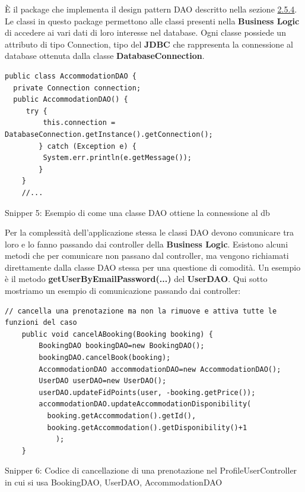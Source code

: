 \documentclass[10pt]{article}
\begin{document}
\`E il package che implementa il design pattern DAO descritto nella sezione \hyperref[daosec]{2.5.4}. Le classi in questo package permettono alle classi presenti nella \textbf{Business Logic} di accedere ai vari dati di loro interesse nel database. Ogni classe possiede un attributo di tipo Connection, tipo del \textbf{JDBC} che rappresenta la connessione al database ottenuta dalla classe \textbf{DatabaseConnection}.
\newline
\begin{lstlisting}
public class AccommodationDAO {
  private Connection connection;
  public AccommodationDAO() {
     try {
         this.connection = DatabaseConnection.getInstance().getConnection();
        } catch (Exception e) {
         System.err.println(e.getMessage());
        }
    }
    //...
\end{lstlisting}
\begin{center}
\par
Snipper 5: Esempio di come una classe DAO ottiene la connessione al db
\par\medskip
\end{center}
Per la complessità dell'applicazione stessa le classi DAO devono comunicare tra loro e lo fanno passando dai controller della \textbf{Business Logic}. Esistono alcuni metodi che per comunicare non passano dal controller, ma vengono richiamati direttamente dalla classe DAO stessa per una questione di comodit\`a. Un esempio è il metodo \textbf{getUserByEmailPassword(...)} del \textbf{UserDAO}.
\newline
Qui sotto mostriamo un esempio di comunicazione passando dai controller:
\begin{lstlisting}
// cancella una prenotazione ma non la rimuove e attiva tutte le funzioni del caso
    public void cancelABooking(Booking booking) {
        BookingDAO bookingDAO=new BookingDAO();
        bookingDAO.cancelBook(booking);
        AccommodationDAO accommodationDAO=new AccommodationDAO();
        UserDAO userDAO=new UserDAO();
        userDAO.updateFidPoints(user, -booking.getPrice());
        accommodationDAO.updateAccommodationDisponibility(
          booking.getAccommodation().getId(),
          booking.getAccommodation().getDisponibility()+1
            );
    }
\end{lstlisting}
\begin{center}
\par
Snipper 6: Codice di cancellazione di una prenotazione nel ProfileUserController in cui si usa BookingDAO, UserDAO, AccommodationDAO
\par\medskip
\end{center}
\end{document}
